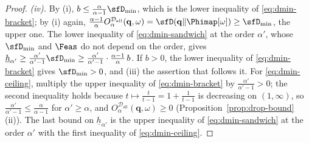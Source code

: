 \begin{proof}
\emph{(iv).} By (i), $b\le\frac{\alpha}{\alpha-1}\sfD_{\min}$, which is the
lower inequality of \eqref{eq:dmin-bracket}; by (i) again,
$\frac{\alpha-1}{\alpha}O^{\mathcal{D}_{\mathrm{all}}}_{\alpha}(\mathbf q,\omega)
=\sfD(\mathbf q\|\Phimap[\omega])\ge\sfD_{\min}$, the upper one. The lower
inequality of \eqref{eq:dmin-sandwich} at the order $\alpha'$, whose
$\sfD_{\min}$ and $\Feas$ do not depend on the order, gives
$\underline{h}_{\alpha'}\ge\frac{\alpha'}{\alpha'-1}\sfD_{\min}
\ge\frac{\alpha'}{\alpha'-1}\cdot\frac{\alpha-1}{\alpha}\,b$. If $b>0$, the
lower inequality of \eqref{eq:dmin-bracket} gives $\sfD_{\min}>0$, and (iii)
the assertion that follows it. For \eqref{eq:dmin-ceiling}, multiply the upper
inequality of \eqref{eq:dmin-bracket} by $\frac{\alpha'}{\alpha'-1}>0$; the
second inequality holds because $t\mapsto\frac{t}{t-1}=1+\frac{1}{t-1}$ is
decreasing on $(1,\infty)$, so $\frac{\alpha'}{\alpha'-1}\le
\frac{\alpha}{\alpha-1}$ for $\alpha'\ge\alpha$, and
$O^{\mathcal{D}_{\mathrm{all}}}_{\alpha}(\mathbf q,\omega)\ge0$
(Proposition~\ref{prop:drop-bound}\,(ii)). The last bound on
$\underline{h}_{\alpha'}$ is the upper inequality of
\eqref{eq:dmin-sandwich} at the order $\alpha'$ with the first inequality of
\eqref{eq:dmin-ceiling}.
\end{proof}
